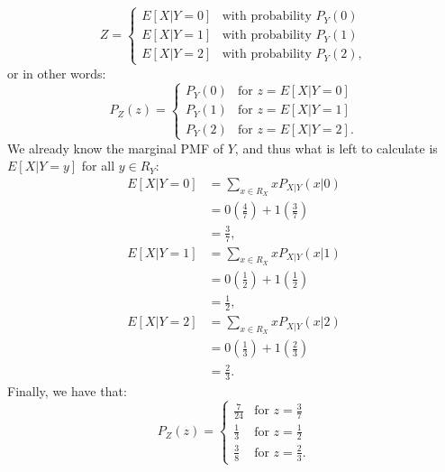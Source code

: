 \begin{problem}{13}
\begin{enumerate}
\[
  Z =
  \begin{cases}
                                   E[X|Y=0]& \text{with probability $P_Y(0)$} \\
                                   E[X|Y=1]& \text{with probability $P_Y(1)$} \\
                                  E[X|Y=2]& \text{with probability $P_Y(2)$},
   \end{cases}
\]
or in other words:
 \[
  P_{Z}(z) =
  \begin{cases}
                                   P_Y(0) & \text{for $z=E[X|Y=0]$} \\
                                    P_Y(1) & \text{for $z=E[X|Y=1]$} \\
                                   P_Y(2) & \text{for $z=E[X|Y=2]$}.
   \end{cases}
\]
We already know the marginal PMF of $Y$, and thus what is left to calculate is $E[X|Y=y]$ for all $y \in R_Y$:
\begin{align*}
E[X|Y=0] &= \sum_{x \in R_X} x P_{X|Y}(x|0) \\
& = 0 \left(\frac{4}{7} \right)+1 \left(\frac{3}{7} \right) \\
& = \frac{3}{7},
\end{align*}
\begin{align*}
E[X|Y=1] &= \sum_{x \in R_X} x P_{X|Y}(x|1) \\
& = 0 \left(\frac{1}{2} \right)+1 \left(\frac{1}{2} \right) \\
& = \frac{1}{2},
\end{align*}
\begin{align*}
E[X|Y=2] &= \sum_{x \in R_X} x P_{X|Y}(x|2) \\
& = 0 \left(\frac{1}{3} \right)+1 \left(\frac{2}{3} \right) \\
& = \frac{2}{3}.
\end{align*}
Finally, we have that:
 \[
  P_{Z}(z) =
  \begin{cases}
                                   \frac{7}{24}& \text{for $z=\frac{3}{7}$} \\
                                    \frac{1}{3} & \text{for $z=\frac{1}{2}$} \\
                                   \frac{3}{8} & \text{for $z=\frac{2}{3}$}.
   \end{cases}
\]



\end{enumerate}
\end{problem}
